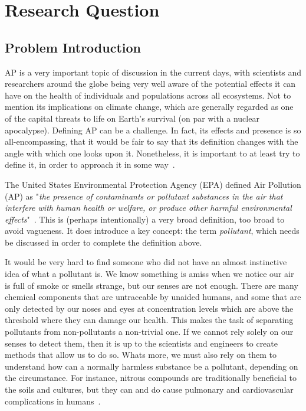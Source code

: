 \chapter{Research Question}
\label{cha:research_question}

\section{Problem Introduction}%
\label{sec:problem_introduction}

\gls{AP} is a very important topic of discussion in the current days,
with scientists and researchers around the globe being very well aware
of the potential effects it can have on the health of individuals and
populations across all ecosystems. Not to mention its implications on
climate change, which are generally regarded as one of the capital
threats to life on Earth's survival (on par with a nuclear apocalypse).
Defining \gls{AP} can be a challenge. In fact, its effects and presence
is so all-encompassing, that it would be fair to say that its definition
changes with the angle with which one looks upon it.  Nonetheless, it is
important to at least try to define it, in order to approach it in some
way~\cite{Lovett2009, Ghorani-Azam2016}.

The United States Environmental Protection Agency (\Gls{EPA}) defined
Air Pollution (\Gls{AP}) as "\textit{the presence of contaminants or
    pollutant substances in the air that interfere with human health or
    welfare, or produce other harmful environmental
effects}"~\cite{Vallero2014}. This is (perhaps intentionally) a very
broad definition, too broad to avoid vagueness. It does introduce a key
concept: the term \emph{pollutant}, which needs be discussed in order
to complete the definition above.

It would be very hard to find someone who did not have an almost
instinctive idea of what a pollutant is. We know something is amiss when
we notice our air is full of smoke or smells strange, but our senses are
not enough. There are many chemical components that are untraceable by
unaided humans, and some that are only detected by our noses and eyes at
concentration levels which are above the threshold where they can damage
our health. This makes the task of separating pollutants from
non-pollutants a non-trivial one. If we cannot rely solely on our senses
to detect them, then it is up to the scientists and engineers to create
methods that allow us to do so. Whats more, we must also rely on them to
understand how can a normally harmless substance be a pollutant,
depending on the circumstance. For instance, nitrous compounds are
traditionally beneficial to the soils and cultures, but they can and do
cause pulmonary and  cardiovascular complications in
humans~\cite{Kampa2008, Ghorani-Azam2016, Carugno2016}.


